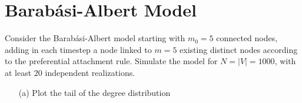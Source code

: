 \section{Barab\'{a}si-Albert Model}

Consider the Barab\'{a}si-Albert model starting with $m_0 = 5$ connected nodes, adding in each timestep a node linked to $m=5$ existing distinct nodes according to the preferential attachment rule. Simulate the model for $N = |V| = 1000$, with at least $20$ independent realizations. 

\begin{enumerate}
    \item[(a)] Plot the tail of the degree distribution 
\end{enumerate}